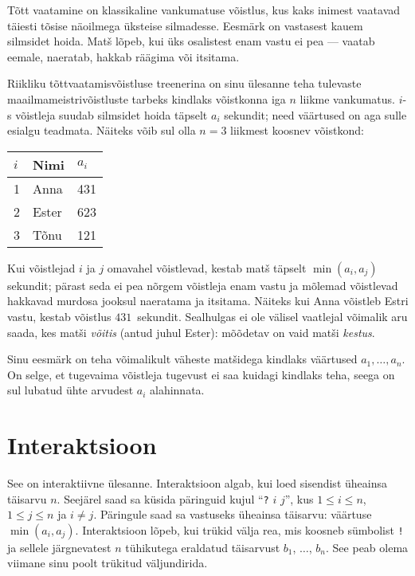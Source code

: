 

\noindent
Tõtt vaatamine on klassikaline vankumatuse võistlus, kus kaks inimest vaatavad täiesti tõsise näoilmega üksteise silmadesse.
Eesmärk on vastasest kauem silmsidet hoida.
Matš lõpeb, kui üks osalistest enam vastu ei pea --- vaatab eemale, naeratab, hakkab räägima või itsitama.

Riikliku tõttvaatamisvõistluse treenerina on sinu ülesanne teha tulevaste maailmameistrivõistluste tarbeks kindlaks võistkonna iga $n$ liikme vankumatus.
$i$-s võistleja suudab silmsidet hoida täpselt $a_i$ sekundit; need väärtused on aga sulle esialgu teadmata.
Näiteks võib sul olla $n=3$ liikmest koosnev võistkond:

\medskip
\begin{tabular}{lll}
  $i$ & Nimi & $a_i$\\\hline
  1 & Anna &  431 \\
  2 & Ester & 623 \\
  3 & Tõnu &  121\\
\end{tabular}

\medskip
Kui võistlejad $i$ ja $j$ omavahel võistlevad, kestab matš täpselt $\min(a_i, a_j)$ sekundit; pärast seda ei pea nõrgem võistleja enam vastu ja mõlemad võistlevad hakkavad murdosa jooksul naeratama ja
itsitama.
Näiteks kui Anna võistleb Estri vastu, kestab võistlus $431$~sekundit.
Sealhulgas ei ole välisel vaatlejal võimalik aru saada, kes matši \emph{võitis} (antud juhul Ester):
mõõdetav on vaid matši \emph{kestus}.

Sinu eesmärk on teha võimalikult väheste matšidega kindlaks väärtused $a_1,\ldots, a_n$.
On selge, et tugevaima võistleja tugevust ei saa kuidagi kindlaks teha, seega on sul lubatud ühte arvudest $a_i$ alahinnata.

\section*{Interaktsioon}

See on interaktiivne ülesanne.
Interaktsioon algab, kui loed sisendist üheainsa täisarvu $n$.
Seejärel saad sa küsida päringuid kujul ``\texttt{?} $i$ $j$'', kus $1\leq i\leq n$, $1\leq j\leq n$ ja $i\neq j$.
Päringule saad sa vastuseks üheainsa täisarvu: väärtuse $\min(a_i, a_j)$.
Interaktsioon lõpeb, kui trükid välja rea, mis koosneb sümbolist \texttt{!} ja sellele järgnevatest $n$ tühikutega eraldatud täisarvust $b_1$, $\ldots$, $b_n$.
See peab olema viimane sinu poolt trükitud väljundirida.

